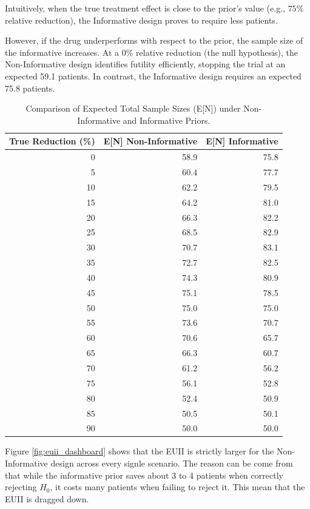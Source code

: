 \documentclass{article}\usepackage[]{graphicx}\usepackage[]{xcolor}
\begin{document}
Intuitively, when the true treatment effect is close to the prior's value (e.g., $75\%$ relative reduction), the Informative design proves to require less patients.

However, if the drug underperforms with respect to the prior, the sample size of the informative increases. At a 0\% relative reduction (the null hypothesis), the Non-Informative design identifies futility efficiently, 
stopping the trial at an expected 59.1 patients. In contrast, the Informative design requires an expected 75.8 patients.

\begin{table}[ht]
\centering
\caption{Comparison of Expected Total Sample Sizes (E[N]) under Non-Informative and Informative Priors.} 
\label{tab:expected_N}
\begin{tabular}{rrr}
  \toprule
True Reduction (\%) & E[N] Non-Informative & E[N] Informative \\ 
  \midrule
0 & 58.9 & 75.8 \\ 
  5 & 60.4 & 77.7 \\ 
  10 & 62.2 & 79.5 \\ 
  15 & 64.2 & 81.0 \\ 
  20 & 66.3 & 82.2 \\ 
  25 & 68.5 & 82.9 \\ 
  30 & 70.7 & 83.1 \\ 
  35 & 72.7 & 82.5 \\ 
  40 & 74.3 & 80.9 \\ 
  45 & 75.1 & 78.5 \\ 
  50 & 75.0 & 75.0 \\ 
  55 & 73.6 & 70.7 \\ 
  60 & 70.6 & 65.7 \\ 
  65 & 66.3 & 60.7 \\ 
  70 & 61.2 & 56.2 \\ 
  75 & 56.1 & 52.8 \\ 
  80 & 52.4 & 50.9 \\ 
  85 & 50.5 & 50.1 \\ 
  90 & 50.0 & 50.0 \\ 
   \bottomrule
\end{tabular}
\end{table}



Figure \ref{fig:euii_dashboard} shows that the EUII is strictly larger for the Non-Informative design across every signle scenario.
The reason can be come from that while the informative prior saves about 3 to 4 patients when correctly rejecting $H_0$, it costs many patients when failing to reject it. This mean that the EUII 
is dragged down.
\end{document}
